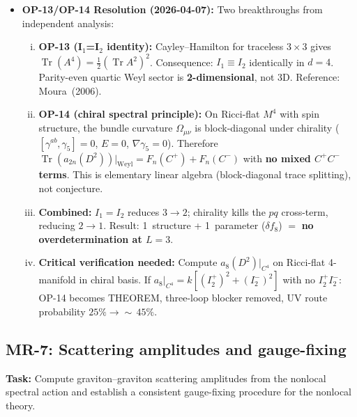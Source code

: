 \documentclass[12pt,a4paper]{article}
\newcommand{\Tr}{\operatorname{Tr}}
\newcommand{\task}[1]{\noindent\textbf{Task:} #1\par}
\begin{document}
\begin{itemize}
\begin{enumerate}[(i)]
        Exact spectral action on~$S^4$: $\Delta = 41/15120\times\Lambda^{-4}$
        non-perturbative floor verified to $4\times 10^{-15}$ relative precision.
        $C=0$ on~$S^4$ limits utility for Weyl-sector physics.
    \end{enumerate}
    Revised survival probability: $87$--$93\%$ (post-CHIRAL-Q $D^2$-quantization).
    See \texttt{theory/consistency-checks/FUND\_program.tex}.
  \item \textbf{OP-13/OP-14 Resolution (2026-04-07):}
    Two breakthroughs from independent analysis:
    \begin{enumerate}[(i)]
      \item \textbf{OP-13 (I$_1$=I$_2$ identity):} Cayley--Hamilton for
        traceless $3\times 3$ gives $\Tr(A^4) = \tfrac{1}{2}(\Tr A^2)^2$.
        Consequence: $I_1 \equiv I_2$ identically in $d=4$. Parity-even
        quartic Weyl sector is \textbf{2-dimensional}, not 3D.
        Reference: Moura~(2006).
      \item \textbf{OP-14 (chiral spectral principle):} On Ricci-flat $M^4$
        with spin structure, the bundle curvature $\Omega_{\mu\nu}$ is
        block-diagonal under chirality ($[\gamma^{ab}, \gamma_5] = 0$,
        $E=0$, $\nabla\gamma_5 = 0$). Therefore
        $\Tr(a_{2n}(D^2))|_{\text{Weyl}} = F_n(C^+) + F_n(C^-)$ with
        \textbf{no mixed $C^+C^-$ terms}. This is elementary linear
        algebra (block-diagonal trace splitting), not conjecture.
      \item \textbf{Combined:} $I_1=I_2$ reduces $3\to 2$; chirality
        kills the $pq$ cross-term, reducing $2\to 1$. Result:
        1~structure + 1~parameter ($\delta f_8$) $=$ \textbf{no
        overdetermination at $L=3$}.
      \item \textbf{Critical verification needed:} Compute
        $a_8(D^2)|_{C^4}$ on Ricci-flat 4-manifold in chiral basis.
        If $a_8|_{C^4} = k[(I_2^+)^2 + (I_2^-)^2]$ with no $I_2^+I_2^-$:
        OP-14 becomes THEOREM, three-loop blocker removed, UV route
        probability $25\% \to {\sim}\,45\%$.
    \end{enumerate}
\end{itemize}

\subsection{MR-7: Scattering amplitudes and gauge-fixing}
\label{task:MR7}

\task{Compute graviton--graviton scattering amplitudes from the nonlocal
spectral action and establish a consistent gauge-fixing procedure for
the nonlocal theory.}
\end{document}

